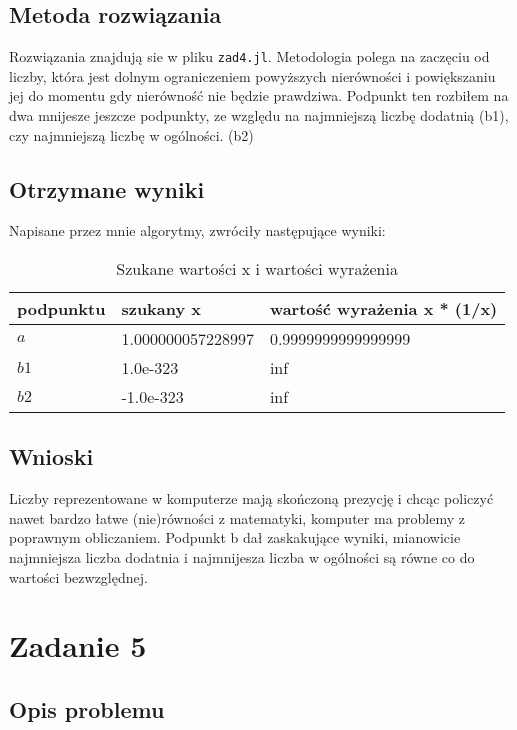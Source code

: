 \documentclass{article}
\begin{document}
\subsection{Metoda rozwiązania}

Rozwiązania znajdują sie w pliku \texttt{zad4.jl}. Metodologia polega na zaczęciu od liczby, która jest dolnym ograniczeniem powyższych nierówności i powiększaniu jej do momentu gdy nierówność nie będzie prawdziwa. Podpunkt ten rozbiłem na dwa mnijesze jeszcze podpunkty, ze względu na najmniejszą liczbę dodatnią (b1), czy najmniejszą liczbę w ogólności. (b2)

\subsection{Otrzymane wyniki}

Napisane przez mnie algorytmy, zwróciły następujące wyniki:

\begin{table}[h!]
    \centering
    \begin{tabular}{|l|l|l|}
     \hline
     podpunktu & szukany x & wartość wyrażenia x * (1/x) \\
     \hline
     \(a\) & 1.000000057228997 & 0.9999999999999999  \\ 
     \(b1\) & 1.0e-323 & inf \\ 
     \(b2\) & -1.0e-323 & inf \\ 
     \hline
    \end{tabular}
    \caption{Szukane wartości x i wartości wyrażenia}
    \label{table:8}
\end{table}

\subsection{Wnioski}

Liczby reprezentowane w komputerze mają skończoną prezycję i chcąc policzyć nawet bardzo łatwe (nie)równości z matematyki, komputer ma problemy z poprawnym obliczaniem. Podpunkt b dał zaskakujące wyniki, mianowicie najmniejsza liczba dodatnia i najmnijesza liczba w ogólności są równe co do wartości bezwzględnej.

\section{Zadanie 5}

\subsection{Opis problemu}
\end{document}
